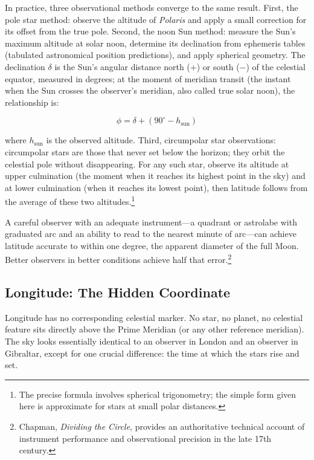 In practice, three observational methods converge to the same result. First, the pole star method: observe the altitude of \emph{Polaris} and apply a small correction for its offset from the true pole. Second, the noon Sun method: measure the Sun's maximum altitude at solar noon, determine its declination from ephemeris tables (tabulated astronomical position predictions), and apply spherical geometry. The declination $\delta$ is the Sun's angular distance north ($+$) or south ($-$) of the celestial equator, measured in degrees; at the moment of meridian transit (the instant when the Sun crosses the observer's meridian, also called true solar noon), the relationship is:

\begin{equation}
\phi = \delta + (90^{\circ} - h_{\text{sun}})
\end{equation}

where $h_{\text{sun}}$ is the observed altitude. Third, circumpolar star observations: circumpolar stars are those that never set below the horizon; they orbit the celestial pole without disappearing. For any such star, observe its altitude at upper culmination (the moment when it reaches its highest point in the sky) and at lower culmination (when it reaches its lowest point), then latitude follows from the average of these two altitudes.\footnote{The precise formula involves spherical trigonometry; the simple form given here is approximate for stars at small polar distances.}

A careful observer with an adequate instrument---a quadrant or astrolabe with graduated arc and an ability to read to the nearest minute of arc---can achieve latitude accurate to within one degree, the apparent diameter of the full Moon. Better observers in better conditions achieve half that error.\footnote{Chapman, \emph{Dividing the Circle}, provides an authoritative technical account of instrument performance and observational precision in the late 17th century.}

\subsection{Longitude: The Hidden Coordinate}

Longitude has no corresponding celestial marker. No star, no planet, no celestial feature sits directly above the Prime Meridian (or any other reference meridian). The sky looks essentially identical to an observer in London and an observer in Gibraltar, except for one crucial difference: the time at which the stars rise and set.


